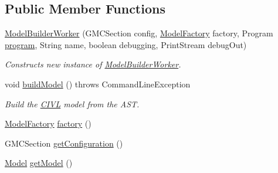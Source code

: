 \subsection*{Public Member Functions}
\begin{DoxyCompactItemize}
\item 
\hyperlink{classedu_1_1udel_1_1cis_1_1vsl_1_1civl_1_1model_1_1common_1_1ModelBuilderWorker_a978803b0ed06a1add665e51102690658}{Model\+Builder\+Worker} (G\+M\+C\+Section config, \hyperlink{interfaceedu_1_1udel_1_1cis_1_1vsl_1_1civl_1_1model_1_1IF_1_1ModelFactory}{Model\+Factory} factory, Program \hyperlink{classedu_1_1udel_1_1cis_1_1vsl_1_1civl_1_1model_1_1common_1_1ModelBuilderWorker_a7e3f8abb32b52ac4db3230cd4c54d9dd}{program}, String name, boolean debugging, Print\+Stream debug\+Out)
\begin{DoxyCompactList}\small\item\em Constructs new instance of \hyperlink{classedu_1_1udel_1_1cis_1_1vsl_1_1civl_1_1model_1_1common_1_1ModelBuilderWorker}{Model\+Builder\+Worker}. \end{DoxyCompactList}\item 
void \hyperlink{classedu_1_1udel_1_1cis_1_1vsl_1_1civl_1_1model_1_1common_1_1ModelBuilderWorker_a8d10ed66bf044c99f29b946331c4a3f4}{build\+Model} ()  throws Command\+Line\+Exception 
\begin{DoxyCompactList}\small\item\em Build the \hyperlink{classedu_1_1udel_1_1cis_1_1vsl_1_1civl_1_1CIVL}{C\+I\+V\+L} model from the A\+S\+T. \end{DoxyCompactList}\item 
\hyperlink{interfaceedu_1_1udel_1_1cis_1_1vsl_1_1civl_1_1model_1_1IF_1_1ModelFactory}{Model\+Factory} \hyperlink{classedu_1_1udel_1_1cis_1_1vsl_1_1civl_1_1model_1_1common_1_1ModelBuilderWorker_ac0ed6bb7342d22aa42db5af7e20d8c02}{factory} ()
\item 
G\+M\+C\+Section \hyperlink{classedu_1_1udel_1_1cis_1_1vsl_1_1civl_1_1model_1_1common_1_1ModelBuilderWorker_a53e01502840bcf1d46678c5bbb228a81}{get\+Configuration} ()
\item 
\hyperlink{interfaceedu_1_1udel_1_1cis_1_1vsl_1_1civl_1_1model_1_1IF_1_1Model}{Model} \hyperlink{classedu_1_1udel_1_1cis_1_1vsl_1_1civl_1_1model_1_1common_1_1ModelBuilderWorker_a7afbfa4a4c52ece02356fd677daaa00f}{get\+Model} ()
\end{DoxyCompactItemize}
